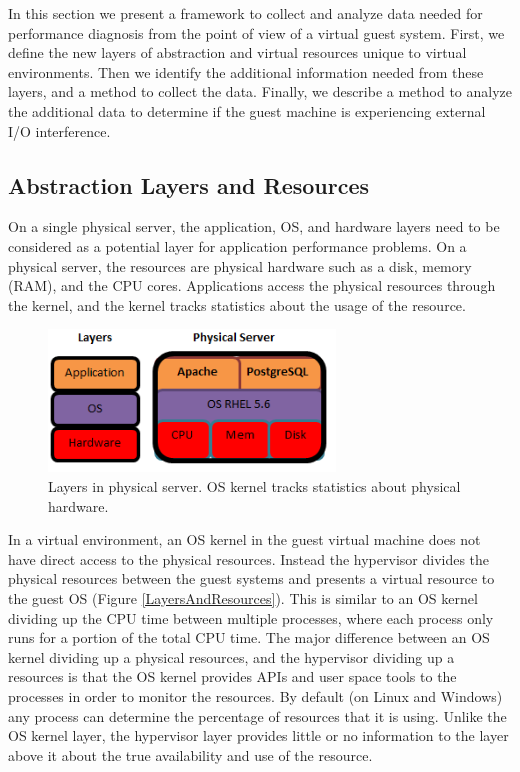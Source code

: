 In this section we present a framework to collect and analyze data needed for performance diagnosis from the point of view of a virtual guest system. 
First, we define the new layers of abstraction and virtual resources unique to virtual environments.  
Then we identify the additional information needed from these layers, and a method to collect the data.
Finally, we describe a method to analyze the additional data to determine if the guest machine is experiencing external I/O interference.

\subsection{Abstraction Layers and Resources}
On a single physical server, the application, OS, and hardware layers need to be considered as a potential layer for application performance problems.  On a physical server, the resources are physical hardware such as a disk, memory (RAM), and the CPU cores.  Applications access the physical resources through the kernel, and the kernel tracks statistics about the usage of the resource.

\begin{figure}[!h]
  \includegraphics[width=3in]{images/LayersPhysical.png}
  \caption{Layers in physical server.  OS kernel tracks statistics about physical hardware.}
  \label{PhysicalLayers}
\end{figure}

In a virtual environment, an OS kernel in the guest virtual machine does not have direct access to the physical resources.  Instead the hypervisor divides the physical resources between the guest systems and presents a virtual resource to the guest OS (Figure \ref{LayersAndResources}).
This is similar to an OS kernel dividing up the CPU time between multiple processes, where each process only runs for a portion of the total CPU time.  
The major difference between an OS kernel dividing up a physical resources, and the hypervisor dividing up a resources is that the OS kernel provides APIs and user space tools to the processes in order to monitor the resources.  By default (on Linux and Windows) any process can determine the percentage of resources that it is using.  Unlike the OS kernel layer, the hypervisor layer provides little or no information to the layer above it about the true availability and use of the resource.

